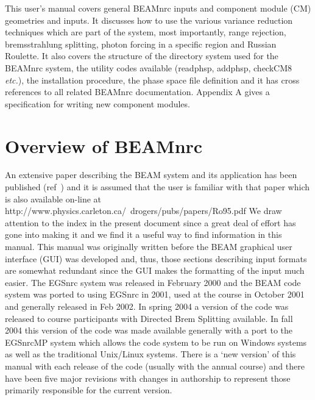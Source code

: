 \documentclass[12pt,twoside]{article}
\newcommand{\etc}{{\em etc.}}
\begin{document}
This user's manual covers general BEAMnrc inputs and component module (CM)
geometries and inputs. It discusses how to use the various variance
reduction techniques which are part of the system, most importantly,
range rejection, bremsstrahlung splitting, photon forcing in a specific
region and Russian Roulette.
It also covers the structure of the directory system used for the
BEAMnrc system, the utility codes available (readphsp, addphsp, checkCM8 \etc),
the installation procedure, the phase space file definition and it
has cross references to all related BEAMnrc documentation.
Appendix A gives a specification for writing new component
modules.
\vspace*{4cm}\\

\tableofcontents

\listoffigures

\setlength{\baselineskip}{0.5cm}

\newpage


\section{Overview of BEAMnrc}

An extensive paper describing the BEAM system and its application has
been published (ref~\cite{Ro95}) and it is assumed that the user is
familiar with that paper which is also available on-line at
{http://www.physics.carleton.ca/~drogers/pubs/papers/Ro95.pdf}
We draw attention to the index in the present document
since a great deal of effort has gone
into making it and we find it a useful way to find information in this
manual.  This manual was originally written before the BEAM graphical
user interface (GUI) was developed\cite{Tr04} and, thus, those sections
describing input formats are somewhat redundant since the GUI makes the
formatting of the input much easier. The EGSnrc
system\cite{Ka99a,KR03,Ro00} was released in February 2000 and the BEAM
code system was ported to using EGSnrc in 2001, used at the course in
October 2001 and generally released in Feb 2002. In spring 2004 a version
of the code was released to course participants with Directed Brem
Splitting available. In fall 2004 this version of the code was made
available generally with a port to the EGSnrcMP system which allows the
code system to be run on Windows systems as well as the traditional
Unix/Linux systems. There is a `new version'
of this manual with each release of the code (usually with the annual
course) and there have been five major
revisions\cite{Ro95b,Ro97,Ro98a,Ro01b,Ro04} with changes in authorship to
represent those primarily responsible for the current version.
 
\end{document}
